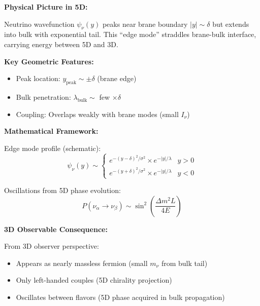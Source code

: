 
\begin{tcolorbox}[colback=blue!5,
                  colframe=blue!75!black,
                  title=\textbf{5D Mechanism: Neutrino as Edge Mode},
                  fonttitle=\bfseries,
                  boxrule=2pt]

\textbf{Physical Picture in 5D:}

Neutrino wavefunction $\psi_\nu(y)$ peaks near brane boundary $|y| \sim \delta$
but extends into bulk with exponential tail.
This ``edge mode'' straddles brane-bulk interface, carrying energy between 5D and 3D.

\textbf{Key Geometric Features:}
\begin{itemize}
\item Peak location: $y_{\text{peak}} \sim \pm \delta$ (brane edge)
\item Bulk penetration: $\lambda_{\text{bulk}} \sim$ few $\times \delta$
\item Coupling: Overlaps weakly with brane modes (small $I_\nu$)
\end{itemize}

\textbf{Mathematical Framework:}

Edge mode profile (schematic):
\begin{equation}
\psi_\nu(y) \sim 
\begin{cases}
e^{-(y-\delta)^2/\sigma^2} \times e^{-|y|/\lambda} & y > 0 \\
e^{-(y+\delta)^2/\sigma^2} \times e^{-|y|/\lambda} & y < 0
\end{cases}
\end{equation}

Oscillations from 5D phase evolution:
\begin{equation}
P(\nu_\alpha \to \nu_\beta) \sim \sin^2\left(\frac{\Delta m^2 L}{4E}\right)
\end{equation}

\textbf{3D Observable Consequence:}

From 3D observer perspective:
\begin{itemize}
\item Appears as nearly massless fermion (small $m_\nu$ from bulk tail)
\item Only left-handed couples (5D chirality projection)
\item Oscillates between flavors (5D phase acquired in bulk propagation)
\end{itemize}


\end{tcolorbox}
